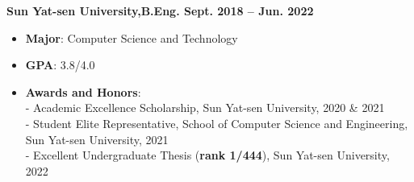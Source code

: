 \documentclass[letterpaper,10pt]{article}
\begin{document}
\begin{CJK}{UTF8}{gbsn}
    
\textbf{Sun Yat-sen University,\space \space \space \space  B.Eng. \space \space \space \space     \hfill Sept. 2018 -- Jun. 2022 } 
\begin{itemize}
        \vspace{-2pt}
        \item \textbf{Major}: Computer Science and Technology
        \vspace{-2pt}
        \item \textbf{GPA}: 3.8/4.0
        \vspace{-2pt}
		\item \textbf{Awards and Honors}: \\
        \vspace{2pt}
		- \space \space Academic Excellence Scholarship, Sun Yat-sen University, 2020 \& 2021\\
        \vspace{2pt}
		- \space \space Student Elite Representative, School of Computer Science and Engineering, Sun Yat-sen University, 2021\\
        
		- \space \space Excellent Undergraduate Thesis (\textbf{rank 1/444}), Sun Yat-sen University, 2022\\
    \end{itemize}





\end{CJK}
\end{document}
